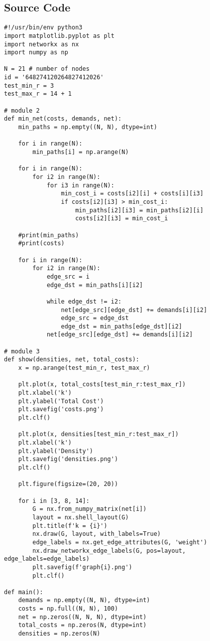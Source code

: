 \documentclass{article}
\begin{document}
\subsection{Source Code}
\begin{verbatim}
#!/usr/bin/env python3
import matplotlib.pyplot as plt
import networkx as nx
import numpy as np

N = 21 # number of nodes
id = '648274120264827412026'
test_min_r = 3
test_max_r = 14 + 1

# module 2
def min_net(costs, demands, net):
    min_paths = np.empty((N, N), dtype=int)

    for i in range(N):
        min_paths[i] = np.arange(N)

    for i in range(N): 
        for i2 in range(N):
            for i3 in range(N):
                min_cost_i = costs[i2][i] + costs[i][i3]
                if costs[i2][i3] > min_cost_i:
                    min_paths[i2][i3] = min_paths[i2][i]
                    costs[i2][i3] = min_cost_i

    #print(min_paths)
    #print(costs)

    for i in range(N):
        for i2 in range(N):
            edge_src = i
            edge_dst = min_paths[i][i2]

            while edge_dst != i2:
                net[edge_src][edge_dst] += demands[i][i2]
                edge_src = edge_dst
                edge_dst = min_paths[edge_dst][i2]
            net[edge_src][edge_dst] += demands[i][i2]

# module 3
def show(densities, net, total_costs):
    x = np.arange(test_min_r, test_max_r)
    
    plt.plot(x, total_costs[test_min_r:test_max_r])
    plt.xlabel('k')
    plt.ylabel('Total Cost')
    plt.savefig('costs.png')
    plt.clf()

    plt.plot(x, densities[test_min_r:test_max_r])
    plt.xlabel('k')
    plt.ylabel('Density')
    plt.savefig('densities.png')
    plt.clf()

    plt.figure(figsize=(20, 20))

    for i in [3, 8, 14]:
        G = nx.from_numpy_matrix(net[i])
        layout = nx.shell_layout(G)
        plt.title(f'k = {i}')
        nx.draw(G, layout, with_labels=True)
        edge_labels = nx.get_edge_attributes(G, 'weight')
        nx.draw_networkx_edge_labels(G, pos=layout, edge_labels=edge_labels)
        plt.savefig(f'graph{i}.png')
        plt.clf()

def main():
    demands = np.empty((N, N), dtype=int)
    costs = np.full((N, N), 100)
    net = np.zeros((N, N, N), dtype=int)
    total_costs = np.zeros(N, dtype=int)
    densities = np.zeros(N)


\end{verbatim}
\end{document}
